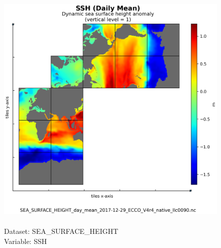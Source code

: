 \begin{figure}[H]
\centering
\includegraphics[scale=0.5]{../images/plots/native_plots/Sea_Surface_Height/SSH.png}
\caption{\\Dataset: SEA\_SURFACE\_HEIGHT\\Variable: SSH}
\label{tab:table-SEA_SURFACE_HEIGHT_SSH-Plot}
\end{figure}
\pagebreak
